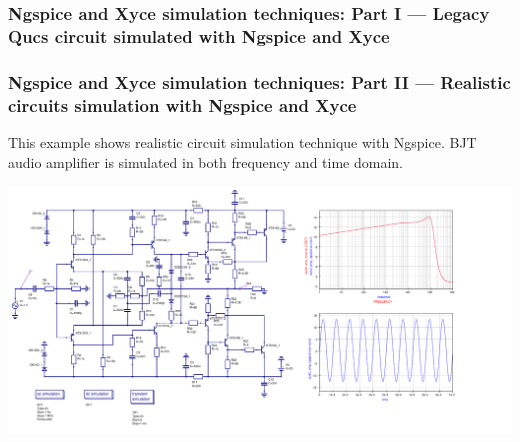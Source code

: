 \documentclass[9pt]{beamer}
\begin{document}
\begin{frame}
 \frametitle{Ngspice and Xyce simulation techniques: Part I --- Legacy Qucs 
circuit simulated with Ngspice and Xyce}
{}


\end{frame}


\begin{frame}
 \frametitle{Ngspice and Xyce simulation techniques: Part II --- Realistic 
circuits simulation with Ngspice and Xyce}
This example shows realistic circuit simulation technique with Ngspice. BJT 
audio amplifier is simulated in both frequency and time domain.

 \includegraphics[width=1.1\textwidth]{img/au_amp.pdf}
\end{frame}
\end{document}
